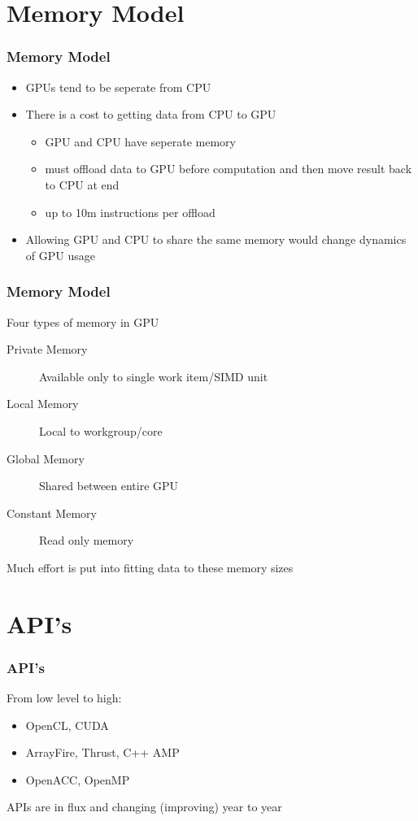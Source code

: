 \documentclass{beamer}
\begin{document}
 \section{Memory Model}
\begin{frame}
	\frametitle{Memory Model}
	\begin{itemize}
		\item GPUs tend to be seperate from CPU
		\item There is a cost to getting data from CPU to GPU
		\begin{itemize}
			\item GPU and CPU have seperate memory
			\item must offload data to GPU before computation and then move result back to CPU at end
			\item up to 10m instructions per offload
		\end{itemize}
		\item Allowing GPU and CPU to share the same memory would change dynamics of GPU usage
	\end{itemize}
\end{frame}
\begin{frame}
	\frametitle{Memory Model}
	Four types of memory in GPU
	\begin{description}
		\item [Private Memory] Available only to single work item/SIMD unit 
		\item [Local Memory] Local to workgroup/core
		\item [Global Memory] Shared between entire GPU
		\item [Constant Memory] Read only memory
	\end{description}
	Much effort is put into fitting data to these memory sizes
\end{frame}

\section{API's}
\begin{frame}
	\frametitle{API's}
	From low level to high:
	\begin{itemize}
		\item OpenCL, CUDA
		\item ArrayFire, Thrust, C++ AMP
		\item OpenACC, OpenMP
	\end{itemize}
	APIs are in flux and changing (improving) year to year
\end{frame}
\end{document}
